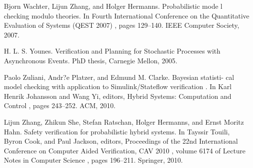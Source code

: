 \documentclass[runningheads,a4paper]{llncs}
\begin{document}
\noindent[WZH07] Bjorn Wachter, Lijun Zhang, and Holger Hermanns. Probabilistic mode l checking modulo theories. In Fourth International Conference on the Quantitative Evaluation of Systems (QEST 2007) , pages 129–140. IEEE Computer Society, 2007.

\noindent[You05] H. L. S. Younes. Verification and Planning for Stochastic Processes with Asynchronous Events. PhD thesis, Carnegie Mellon, 2005.

\noindent[ZPC10] Paolo Zuliani, Andr?e Platzer, and Edmund M. Clarke. Bayesian statisti- cal model checking with application to Simulink/Stateflow verification . In Karl Henrik Johansson and Wang Yi, editors, Hybrid Systems: Computation and Control , pages 243–252. ACM, 2010.

\noindent[ZSR + 10] Lijun Zhang, Zhikun She, Stefan Ratschan, Holger Hermanns, and Ernst Moritz Hahn. Safety verification for probabilistic hybrid systems. In Tayssir Touili, Byron Cook, and Paul Jackson, editors, Proceedings of the 22nd International Conference on Computer Aided Verification, CAV 2010 , volume 6174 of Lecture Notes in Computer Science , pages 196–211. Springer, 2010.
\end{document}
